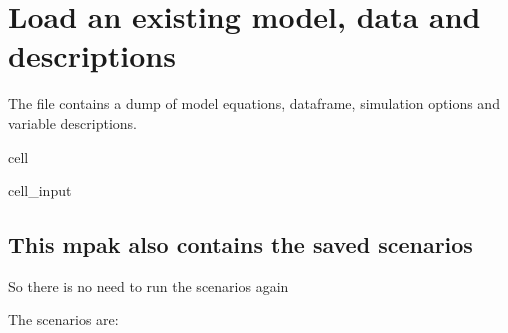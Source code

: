 \documentclass[letterpaper,10pt,english]{jupyterBook}
\begin{document}
\section{Load an existing model, data and descriptions}
\label{\detokenize{content/howto/keep/Create and modify charts with keep_plot:load-an-existing-model-data-and-descriptions}}
\sphinxAtStartPar
The file  contains a dump of model equations, dataframe, simulation options and variable descriptions.

\begin{sphinxuseclass}{cell}\begin{sphinxVerbatimInput}

\begin{sphinxuseclass}{cell_input}
\begin{sphinxVerbatim}[commandchars=\\\{\}]
  
\end{sphinxVerbatim}

\end{sphinxuseclass}\end{sphinxVerbatimInput}

\end{sphinxuseclass}

\subsection{This mpak also contains the saved scenarios}
\label{\detokenize{content/howto/keep/Create and modify charts with keep_plot:this-mpak-also-contains-the-saved-scenarios}}
\sphinxAtStartPar
So there is no need to run the scenarios again

\sphinxAtStartPar
The scenarios are:
\end{document}
